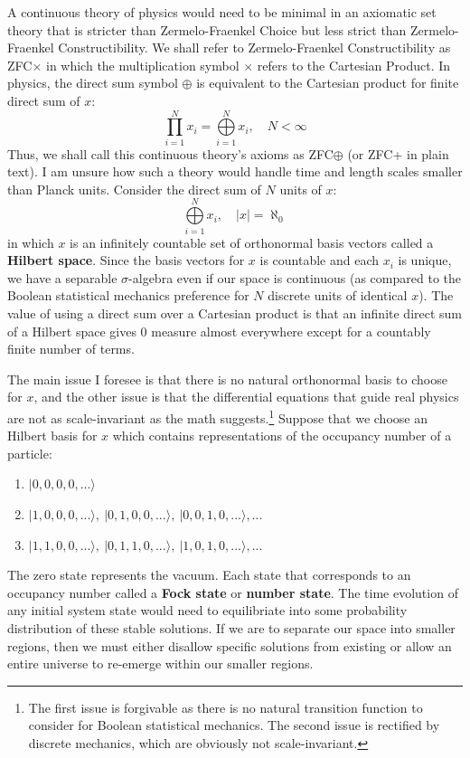\documentclass[10pt, a5paper, twoside, openright]{memoir}
\begin{document}
A continuous theory of physics would need to be minimal in an axiomatic set theory that is stricter than Zermelo-Fraenkel Choice but less strict than Zermelo-Fraenkel Constructibility. We shall refer to Zermelo-Fraenkel Constructibility as ZFC$\times$ in which the multiplication symbol $\times$ refers to the Cartesian Product. In physics, the direct sum symbol $\oplus$ is equivalent to the Cartesian product for finite direct sum of $x$:
$$\prod\limits_{i=1}^N x_i = \bigoplus\limits_{i=1}^N x_i, \quad N < \infty$$
Thus, we shall call this continuous theory's axioms as ZFC$\oplus$ (or ZFC+ in plain text). I am unsure how such a theory would handle time and length scales smaller than Planck units. Consider the direct sum of $N$ units of $x$:
$$\bigoplus\limits_{i=1}^N x_i, \quad |x| = \aleph_{0} $$
in which $x$ is an infinitely countable set of orthonormal basis vectors called a \textbf{Hilbert space}. Since the basis vectors for $x$ is countable and each $x_i$ is unique, we have a separable $\sigma$-algebra even if our space is continuous (as compared to the Boolean statistical mechanics preference for $N$ discrete units of identical $x$). The value of using a direct sum over a Cartesian product is that an infinite direct sum of a Hilbert space gives $0$ measure almost everywhere except for a countably finite number of terms.

The main issue I foresee is that there is no natural orthonormal basis to choose for $x$, and the other issue is that the differential equations that guide real physics are not as scale-invariant as the math suggests.\footnote{The first issue is forgivable as there is no natural transition function to consider for Boolean statistical mechanics. The second issue is rectified by discrete mechanics, which are obviously not scale-invariant.} Suppose that we choose an Hilbert basis for $x$ which contains representations of the occupancy number of a particle:
\begin{enumerate}
\item[$0:$] $| 0, 0, 0, 0, ...\rangle $
\item[$1:$] $| 1, 0, 0, 0, ...\rangle, \ | 0, 1, 0, 0, ...\rangle, \ | 0, 0, 1, 0, ...\rangle, ... $
\item[$2:$] $| 1, 1, 0, 0, ...\rangle, \ | 0, 1, 1, 0, ...\rangle, \ | 1, 0, 1, 0, ...\rangle, ... $
\end{enumerate}
The zero state represents the vacuum. Each state that corresponds to an occupancy number called a \textbf{Fock state} or \textbf{number state}. The time evolution of any initial system state would need to equilibriate into some probability distribution of these stable solutions. If we are to separate our space into smaller regions, then we must either disallow specific solutions from existing or allow an entire universe to re-emerge within our smaller regions. 
\end{document}
